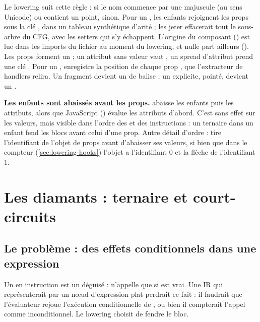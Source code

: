 Le lowering suit cette règle :  si le nom commence par une majuscule (au sens Unicode) ou contient un point,  sinon. Pour un , les enfants rejoignent les props sous la clé , dans un tableau synthétique d'arité  ; les jeter effacerait tout le sous-arbre du CFG, avec les setters qui s'y échappent. L'origine du composant () est lue dans les imports du fichier au moment du lowering, et nulle part ailleurs (). Les props forment un  ; un attribut sans valeur vaut , un spread d'attribut prend une clé . Pour un ,  enregistre la position de chaque prop , que l'extracteur de handlers relira. Un fragment  devient un  de balise  ; un  explicite, pointé, devient un .

\begin{piege}
\textbf{Les enfants sont abaissés avant les props.}  abaisse les enfants puis les attributs, alors que JavaScript () évalue les attributs d'abord. C'est sans effet sur les valeurs, mais visible dans l'ordre des  et des instructions : un ternaire dans un enfant fend les blocs avant celui d'une prop. Autre détail d'ordre :  tire l'identifiant de l'objet de props avant d'abaisser ses valeurs, si bien que dans le compteur (\cref{sec:lowering-hooks}) l'objet a l'identifiant 0 et la flèche de  l'identifiant 1.
\end{piege}

\section{Les diamants : ternaire et court-circuits}
\label{sec:lowering-diamants}

\subsection{Le problème : des effets conditionnels dans une expression}

Un \code{&&} en instruction est un  déguisé :  n'appelle  que si  est vrai. Une IR qui représenterait  par un nœud d'expression plat perdrait ce fait : il faudrait que l'évaluateur rejoue l'exécution conditionnelle de , ou bien il compterait l'appel comme inconditionnel. Le lowering choisit de fendre le bloc.

